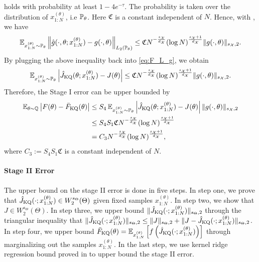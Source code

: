 holds with probability at least $1 - 4 e^{-\tau}$. The probability is taken over the distribution of $x_{1:N}^{(\theta)}$, i.e $\mathbb{P}_\theta$.
Here $\mathfrak{C}$ is a constant independent of $N$. 
Hence, with , we have
\begin{align}\label{eq:F_KQ_F}
     \operatorname{\mathbb{E}}_{x_{1:N}^{(\theta)} \sim \mathbb{P}_\theta} \left\| \hat{g}(\cdot, \theta; x_{1:N}^{(\theta)}) - g(\cdot, \theta) \right\|_{L_2( \mathbb{P}_\theta ) } \leq \mathfrak{C} N^{-\frac{s_{\mathcal{X}}}{d_{\mathcal{X}}}} (\log N)^{\frac{s_{\mathcal{X}}+1}{d_{\mathcal{X}}}} \| g(\cdot, \theta)\|_{s_{\mathcal{X}},2}.
\end{align}
By plugging the above inequality back into \eqref{eq:F_L_g}, we obtain
\begin{align*}
    \operatorname{\mathbb{E}}_{x_{1:N}^{(\theta)} \sim \mathbb{P}_\theta} \left| \hat{J}_{\text{KQ}}(\theta; x_{1:N}^{(\theta)}) - J(\theta) \right| \leq \mathfrak{C} N^{-\frac{s_{\mathcal{X}}}{d_{\mathcal{X}}}} (\log N)^{\frac{s_{\mathcal{X}}+1}{d_{\mathcal{X}}}} \| g(\cdot, \theta)\|_{s_{\mathcal{X}},2}.
\end{align*}
Therefore, the Stage I error can be upper bounded by
\begin{align}\label{eq:stage_1}
 \operatorname{\mathbb{E}}_{\theta \sim \mathbb{Q}} \left| F(\theta) - \bar{F}_{\text{KQ}}(\theta) \right| 
&\leq S_4 \operatorname{\mathbb{E}}_{x_{1:N}^{(\theta)} \sim \mathbb{P}_\theta} \left| \hat{J}_{\text{KQ}}(\theta; x_{1:N}^{(\theta)}) - J(\theta) \right| \| g(\cdot, \theta)\|_{s_{\mathcal{X}},2} \nonumber \\
&\leq S_4 S_1 \mathfrak{C} N^{-\frac{ s_{\mathcal{X}}}{d_{\mathcal{X}}}} (\log N)^{\frac{s_{\mathcal{X}}+1}{d_{\mathcal{X}}}} \nonumber \\
&= C_3 N^{-\frac{ s_{\mathcal{X}}}{d_{\mathcal{X}}}} (\log N)^{\frac{s_{\mathcal{X}}+1}{d_{\mathcal{X}}}},
\end{align}
where $C_3 := S_4 S_1 \mathfrak{C}$ is a constant independent of $N$.

\paragraph{Stage II Error}
The upper bound on the stage II error is done in five steps. In step one, we prove that $\hat{J}_{\text{KQ}}(\cdot; x_{1:N}^{(\theta)}) \in W_2^{s_\Theta} (\Theta)$ given fixed samples $x_{1:N}^{(\theta)}$. In step two, we show that $J \in W_2^{s_\Theta} (\Theta)$. 
In step three, we upper bound $\|\hat{J}_{\text{KQ}}(\cdot; x_{1:N}^{(\theta)})\|_{s_\Theta,2}$ through the triangular inequality that
$\|\hat{J}_{\text{KQ}}(\cdot; x_{1:N}^{(\theta)})\|_{s_\Theta,2} \leq \|J\|_{s_\Theta,2} + \|J - \hat{J}_{\text{KQ}}(\cdot; x_{1:N}^{(\theta)})\|_{s_\Theta,2}$.
In step four, we upper bound $\bar{F}_{\text{KQ}}(\theta) = \operatorname{\mathbb{E}}_{x_{1:N}^{(\theta)}}\left[f\left( \hat{J}_{\text{KQ}}(\cdot; x_{1:N}^{(\theta)}) \right)\right]$ through marginalizing out the samples $x_{1:N}^{(\theta)}$. In the last step, we use kernel ridge regression bound proved in  to upper bound the stage II error.

